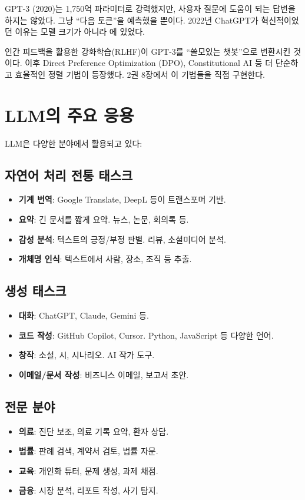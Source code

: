 GPT-3 (2020)는 1,750억 파라미터로 강력했지만, 사용자 질문에 도움이 되는 답변을 하지는 않았다. 그냥 ``다음 토큰''을 예측했을 뿐이다. 2022년 ChatGPT가 혁신적이었던 이유는 모델 크기가 아니라 에 있었다.

인간 피드백을 활용한 강화학습(RLHF)이 GPT-3를 ``쓸모있는 챗봇''으로 변환시킨 것이다. 이후 Direct Preference Optimization (DPO), Constitutional AI 등 더 단순하고 효율적인 정렬 기법이 등장했다. 2권 8장에서 이 기법들을 직접 구현한다.

\section{LLM의 주요 응용}

LLM은 다양한 분야에서 활용되고 있다:

\subsection{자연어 처리 전통 태스크}
\begin{itemize}
  \item \textbf{기계 번역}: Google Translate, DeepL 등이 트랜스포머 기반.
  \item \textbf{요약}: 긴 문서를 짧게 요약. 뉴스, 논문, 회의록 등.
  \item \textbf{감성 분석}: 텍스트의 긍정/부정 판별. 리뷰, 소셜미디어 분석.
  \item \textbf{개체명 인식}: 텍스트에서 사람, 장소, 조직 등 추출.
\end{itemize}

\subsection{생성 태스크}
\begin{itemize}
  \item \textbf{대화}: ChatGPT, Claude, Gemini 등.
  \item \textbf{코드 작성}: GitHub Copilot, Cursor. Python, JavaScript 등 다양한 언어.
  \item \textbf{창작}: 소설, 시, 시나리오. AI 작가 도구.
  \item \textbf{이메일/문서 작성}: 비즈니스 이메일, 보고서 초안.
\end{itemize}

\subsection{전문 분야}
\begin{itemize}
  \item \textbf{의료}: 진단 보조, 의료 기록 요약, 환자 상담.
  \item \textbf{법률}: 판례 검색, 계약서 검토, 법률 자문.
  \item \textbf{교육}: 개인화 튜터, 문제 생성, 과제 채점.
  \item \textbf{금융}: 시장 분석, 리포트 작성, 사기 탐지.
\end{itemize}

